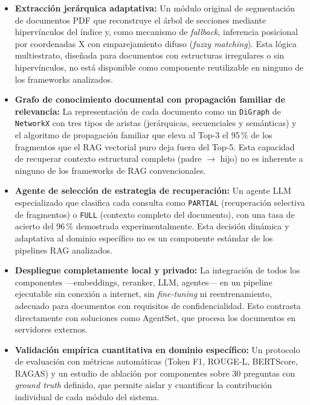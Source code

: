 \begin{itemize}
    \item \textbf{Extracción jerárquica adaptativa:} Un módulo original de segmentación de documentos PDF que reconstruye el árbol de secciones mediante hipervínculos del índice y, como mecanismo de \textit{fallback}, inferencia posicional por coordenadas X con emparejamiento difuso (\textit{fuzzy matching}). Esta lógica multiestrato, diseñada para documentos con estructuras irregulares o sin hipervínculos, no está disponible como componente reutilizable en ninguno de los frameworks analizados.

    \item \textbf{Grafo de conocimiento documental con propagación familiar de relevancia:} La representación de cada documento como un \texttt{DiGraph} de \texttt{NetworkX} con tres tipos de aristas (jerárquicas, secuenciales y semánticas) y el algoritmo de propagación familiar que eleva al Top-3 el 95\,\% de los fragmentos que el RAG vectorial puro deja fuera del Top-5. Esta capacidad de recuperar contexto estructural completo (padre $\rightarrow$ hijo) no es inherente a ninguno de los frameworks de RAG convencionales.

    \item \textbf{Agente de selección de estrategia de recuperación:} Un agente LLM especializado que clasifica cada consulta como \texttt{PARTIAL} (recuperación selectiva de fragmentos) o \texttt{FULL} (contexto completo del documento), con una tasa de acierto del 96\,\% demostrada experimentalmente. Esta decisión dinámica y adaptativa al dominio específico no es un componente estándar de los pipelines RAG analizados.

    \item \textbf{Despliegue completamente local y privado:} La integración de todos los componentes —embeddings, reranker, LLM, agentes— en un pipeline ejecutable sin conexión a internet, sin \textit{fine-tuning} ni reentrenamiento, adecuado para documentos con requisitos de confidencialidad. Esto contrasta directamente con soluciones como AgentSet, que procesa los documentos en servidores externos.

    \item \textbf{Validación empírica cuantitativa en dominio específico:} Un protocolo de evaluación con métricas automáticas (Token F1, ROUGE-L, BERTScore, RAGAS) y un estudio de ablación por componentes sobre 30 preguntas con \textit{ground truth} definido, que permite aislar y cuantificar la contribución individual de cada módulo del sistema.
\end{itemize}

